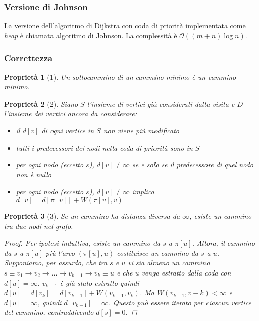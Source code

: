 \documentclass[11pt]{book}
\newtheorem*{proprietà}{Proprietà}
\begin{document}
\subsubsection{Versione di Johnson}
La versione dell'algoritmo di Dijkstra con coda di priorità implementata come \textit{heap} è chiamata algoritmo di Johnson.
La complessità è $\mathcal{O}((m+n)\log n)$.
\subsubsection{Correttezza}
\begin{proprietà}[1]
    Un sottocammino di un cammino minimo è un \textit{cammino minimo}.
\end{proprietà}
\begin{proprietà}[2]
    Siano $S$ l'insieme di vertici già considerati dalla visita e $D$ l'insieme dei vertici ancora da considerare:
    \begin{itemize}
        \item[2.1.] il $d[v]$ di ogni vertice in $S$ non viene più modificato
        \item[2.2.] tutti i predecessori dei nodi nella coda di priorità sono in $S$
        \item[2.3.] per ogni nodo (eccetto $s$), $d[v]\neq \infty$ se e solo se il predecessore di quel nodo non è nullo 
        \item[2.4.] per ogni nodo (eccetto $s$), $d[v]\neq \infty$ implica $d[v]=d[\pi[v]]+W(\pi[v],v)$
    \end{itemize}
\end{proprietà}
\begin{proprietà}[3]
    Se un cammino ha distanza diversa da $\infty$, esiste un cammino tra due nodi nel grafo.
    \begin{proof}
        Per ipotesi induttiva, esiste un cammino da $s$ a $\pi[u]$. Allora, il cammino da $s$ a $\pi[u]$ più l'arco 
        $(\pi[u],u)$ costituisce un cammino da $s$ a $u$.\\
        Supponiamo, per assurdo, che tra $s$ e $u$ vi sia almeno un cammino $s\equiv v_1\rightarrow v_2 \rightarrow \dots \rightarrow v_{k-1} \rightarrow v_k \equiv u$
        e che $u$ venga estratto dalla coda con $d[u]=\infty$. $v_{k-1}$ è già stato estratto quindi 
        $d[u]=d[v_k]=d[v_{k-1}]+W(v_{k-1},v_k)$. Ma $W(v_{k-1},v-k)<\infty$ e $d[u]=\infty$, quindi $d[v_{k-1}]=\infty$.
        Questo può essere iterato per ciascun vertice del cammino, contraddicendo $d[s]=0$.
    \end{proof}
\end{proprietà}
\end{document}
